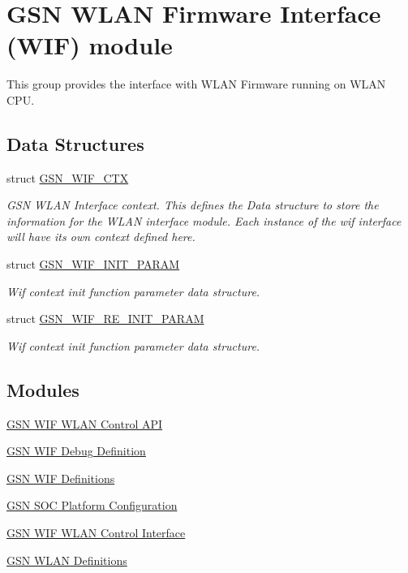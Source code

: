 \hypertarget{a00635}{
\section{GSN WLAN Firmware Interface (WIF) module}
\label{a00635}
}


This group provides the interface with WLAN Firmware running on WLAN CPU.  


\subsection*{Data Structures}
\begin{DoxyCompactItemize}
\item 
struct \hyperlink{a00323}{GSN\_\-WIF\_\-CTX}
\begin{DoxyCompactList}\small\item\em GSN WLAN Interface context. This defines the Data structure to store the information for the WLAN interface module. Each instance of the wif interface will have its own context defined here. \end{DoxyCompactList}\item 
struct \hyperlink{a00338}{GSN\_\-WIF\_\-INIT\_\-PARAM}
\begin{DoxyCompactList}\small\item\em Wif context init function parameter data structure. \end{DoxyCompactList}\item 
struct \hyperlink{a00342}{GSN\_\-WIF\_\-RE\_\-INIT\_\-PARAM}
\begin{DoxyCompactList}\small\item\em Wif context init function parameter data structure. \end{DoxyCompactList}\end{DoxyCompactItemize}
\subsection*{Modules}
\begin{DoxyCompactItemize}
\item 
\hyperlink{a00636}{GSN WIF WLAN Control API}
\item 
\hyperlink{a00637}{GSN WIF Debug Definition}
\item 
\hyperlink{a00638}{GSN WIF Definitions}
\item 
\hyperlink{a00639}{GSN SOC Platform Configuration}
\item 
\hyperlink{a00640}{GSN WIF WLAN Control Interface}
\item 
\hyperlink{a00641}{GSN WLAN Definitions}
\end{DoxyCompactItemize}
